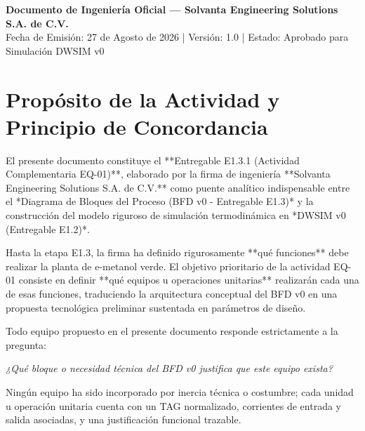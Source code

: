 \documentclass[11pt,letterpaper]{article}
\begin{document}
\begin{titlepage}
    \vfill

    \begin{tcolorbox}[colback=white,colframe=SolvantaTeal,arc=2mm,boxrule=0.8pt]
        \small \centering
        \textbf{Documento de Ingeniería Oficial — Solvanta Engineering Solutions S.A. de C.V.}\\[0.1cm]
        Fecha de Emisión: 27 de Agosto de 2026 \quad | \quad Versión: 1.0 \quad | \quad Estado: Aprobado para Simulación DWSIM v0
    \end{tcolorbox}
\end{titlepage}

\newpage

\section{Propósito de la Actividad y Principio de Concordancia}

El presente documento constituye el **Entregable E1.3.1 (Actividad Complementaria EQ-01)**, elaborado por la firma de ingeniería **Solvanta Engineering Solutions S.A. de C.V.** como puente analítico indispensable entre el *Diagrama de Bloques del Proceso (BFD v0 - Entregable E1.3)* y la construcción del modelo riguroso de simulación termodinámica en *DWSIM v0 (Entregable E1.2)*.

Hasta la etapa E1.3, la firma ha definido rigurosamente **qué funciones** debe realizar la planta de e-metanol verde. El objetivo prioritario de la actividad EQ-01 consiste en definir **qué equipos u operaciones unitarias** realizarán cada una de esas funciones, traduciendo la arquitectura conceptual del BFD v0 en una propuesta tecnológica preliminar sustentada en parámetros de diseño.

\begin{tcolorbox}[colback=SolvantaLightGray,colframe=SolvantaNavy,title=\textbf{Principio de Concordancia Fundamental (Regla BFD $\rightarrow$ EQ-01)}]
\small
Todo equipo propuesto en el presente documento responde estrictamente a la pregunta:
\begin{center}
    \textit{¿Qué bloque o necesidad técnica del BFD v0 justifica que este equipo exista?}
\end{center}
Ningún equipo ha sido incorporado por inercia técnica o costumbre; cada unidad u operación unitaria cuenta con un TAG normalizado, corrientes de entrada y salida asociadas, y una justificación funcional trazable.
\end{tcolorbox}
\end{document}
